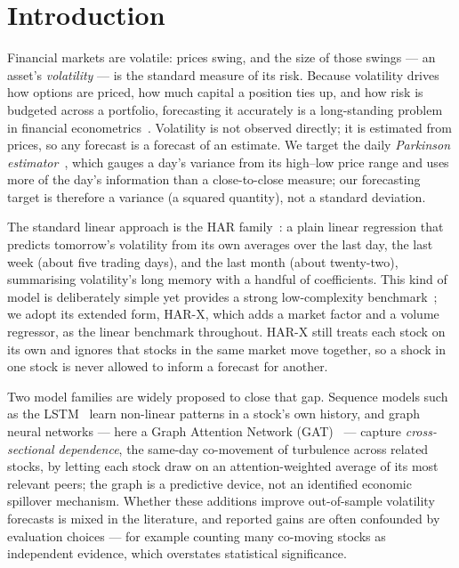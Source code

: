 \documentclass[runningheads]{llncs}
\begin{document}
\section{Introduction}
Financial markets are volatile: prices swing, and the size of those swings --- an asset's
\emph{volatility} --- is the standard measure of its risk. Because volatility drives how options
are priced, how much capital a position ties up, and how risk is budgeted across a portfolio,
forecasting it accurately is a long-standing problem in financial econometrics~\cite{corsi2009}.
Volatility is not observed directly; it is estimated from prices, so any forecast is a forecast of
an estimate. We target the daily \emph{Parkinson estimator}~\cite{parkinson1980}, which gauges a day's
variance from its high--low price range and uses more of the day's information than a close-to-close
measure; our
forecasting target is therefore a variance (a squared quantity), not a standard deviation.

The standard linear approach is the HAR family~\cite{corsi2009}: a plain linear regression that
predicts tomorrow's volatility from its own averages over the last day, the last week (about five
trading days), and the last month (about twenty-two), summarising volatility's long memory with a
handful of coefficients. This kind of model is deliberately simple yet provides a strong
low-complexity benchmark~\cite{corsi2009,audrino2025}; we adopt its extended form, HAR-X, which adds a
market factor and a volume regressor, as the linear benchmark throughout. HAR-X still treats each
stock on its own and ignores that stocks in the same market move together, so a shock in one stock is
never allowed to inform a forecast for another.

Two model families are widely proposed to close that gap. Sequence models such as the
LSTM~\cite{lstm1997} learn non-linear patterns in a stock's own history, and graph neural networks
--- here a Graph Attention Network (GAT)~\cite{gat2018} --- capture \emph{cross-sectional dependence},
the same-day co-movement of turbulence across related stocks, by letting each stock draw on an
attention-weighted average of its most relevant peers; the graph is a predictive device, not an
identified economic spillover mechanism. Whether these additions improve
out-of-sample volatility forecasts is mixed in the literature, and reported gains are often
confounded by evaluation choices --- for example counting many co-moving stocks as independent
evidence, which overstates statistical significance.
\end{document}
